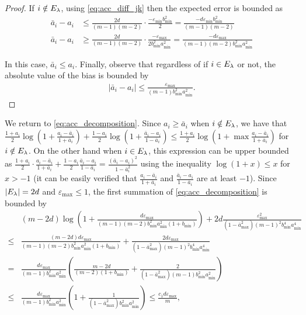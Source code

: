 \begin{proof}
If $i \notin E_{\lambda}$, using \eqref{eq:acc_diff_jk} then the expected error is bounded as
\begin{align*}
\bar{a}_i - a_i &\le \frac{2d}{(m - 1)(m - 2)} \cdot \frac{-\varepsilon_{\min} b_{\min}^2}{2} = \frac{-d\varepsilon_{\min} b_{\min}^2 }{(m - 1)(m - 2)}  \\
\bar{a}_i - a_i &\ge \frac{2d}{(m - 1)(m - 2)}  \cdot \frac{-\varepsilon_{\max}}{2 b_{\min}^2 a_{\min}^2} = \frac{-d \varepsilon_{\max}}{(m - 1)(m - 2) b_{\min}^2 a_{\min}^2} 
\end{align*}

In this case, $\bar{a}_i \le a_i$. Finally, observe that regardless of if $i \in E_{\lambda}$ or not, the absolute value of the bias is bounded by  
\begin{align}
    |\bar{a}_i - a_i| \le \frac{\varepsilon_{\max}}{(m - 1)b_{\min}^2 a_{\min}^2}.
\end{align}
\end{proof}

We return to \eqref{eq:acc_decomposition}. Since $a_i \ge \bar{a}_i$ when $i \notin E_{\lambda}$, we have that $\frac{1 + a_i}{2}\log(1 + \frac{a_i - \bar{a}_i}{1 + \bar{a}_i}) + \frac{1 - a_i}{2} \log (1 + \frac{\bar{a}_i - a_i}{1 - \bar{a}_i}) \le \frac{1 + a_i}{2} \log (1 + \max \frac{a_i - \bar{a}_i}{1 + \bar{a}_i})$ for $i \notin E_{\lambda}$. On the other hand when $i \in E_{\lambda}$, this expression can be upper bounded as $\frac{1+a_i}{2} \cdot \frac{a_i - \bar{a}_i}{1 + \bar{a}_i} + \frac{1 - a_i}{2} \frac{\bar{a}_i - a_i}{1 - \bar{a}_i} = \frac{(\bar{a}_i - a_i)^2}{1 - \bar{a}_i^2}$ using the inequality $\log(1 + x) \le x$ for $x > -1$ (it can be easily verified that $\frac{a_i - \bar{a}_i}{1 + \bar{a}_i}$ and $\frac{\bar{a}_i - a_i}{1 - \bar{a}_i}$ are at least $-1$). Since $|E_{\lambda}| = 2d$ and $\varepsilon_{\max} \le 1$, the first summation of \eqref{eq:acc_decomposition} is bounded by 
\begin{align}
    &(m - 2d) \log \left(1 + \frac{d\varepsilon_{\max}}{(m - 1)(m - 2) b_{\min}^2 a_{\min}^2 (1 + b_{\min})} \right) + 2d \frac{\varepsilon_{\max}^2}{(1 - \bar{a}_{\max}^2) (m - 1)^2 b_{\min}^4 a_{\min}^4} \\
    \le &\frac{(m - 2d) d\varepsilon_{\max}}{(m - 1)(m - 2) b_{\min}^2 a_{\min}^2 (1 + b_{\min})} + \frac{2d \varepsilon_{\max}}{(1 - \bar{a}_{\max}^2) (m - 1)^2 b_{\min}^4 a_{\min}^4} \\
    = & \frac{d\varepsilon_{\max}}{(m - 1)b_{\min}^2 a_{\min}^2} \left( \frac{m - 2d}{(m - 2)(1 + b_{\min})} + \frac{2}{(1 - \bar{a}_{\max}^2)(m - 1) b_{\min}^2 a_{\min}^2}\right) \\
    \le & \frac{d\varepsilon_{\max}}{(m - 1)b_{\min}^2 a_{\min}^2} \left(1 + \frac{1}{(1 - \bar{a}_{\max}^2) b_{\min}^2 a_{\min}^2}\right) \le \frac{c_1 d \varepsilon_{\max}}{m},
\end{align}

